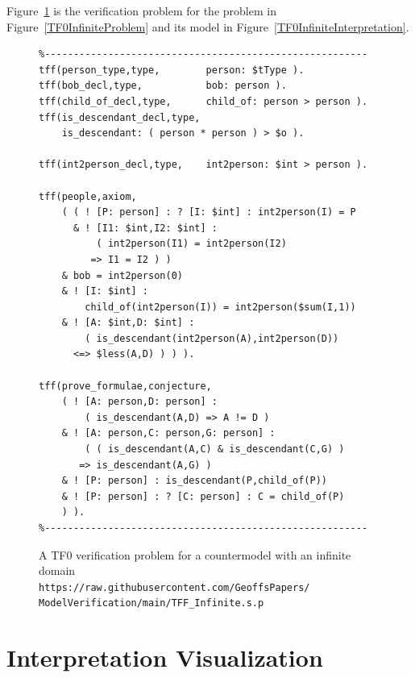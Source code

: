 \documentclass[letterpaper]{article}
\begin{document}
Figure~\ref{TF0InfiniteVerification} is the verification problem for the problem in 
Figure~\ref{TF0InfiniteProblem} and its model in Figure~\ref{TF0InfiniteInterpretation}.

\begin{figure}[htbp]
\scriptsize
{}
\begin{verbatim}
%--------------------------------------------------------
tff(person_type,type,        person: $tType ).
tff(bob_decl,type,           bob: person ).
tff(child_of_decl,type,      child_of: person > person ).
tff(is_descendant_decl,type, 
    is_descendant: ( person * person ) > $o ).

tff(int2person_decl,type,    int2person: $int > person ).

tff(people,axiom,
    ( ( ! [P: person] : ? [I: $int] : int2person(I) = P
      & ! [I1: $int,I2: $int] : 
          ( int2person(I1) = int2person(I2) 
         => I1 = I2 ) )
    & bob = int2person(0)
    & ! [I: $int] : 
        child_of(int2person(I)) = int2person($sum(I,1))
    & ! [A: $int,D: $int] : 
        ( is_descendant(int2person(A),int2person(D)) 
      <=> $less(A,D) ) ) ).

tff(prove_formulae,conjecture,
    ( ! [A: person,D: person] : 
        ( is_descendant(A,D) => A != D )
    & ! [A: person,C: person,G: person] :
        ( ( is_descendant(A,C) & is_descendant(C,G) )
       => is_descendant(A,G) )
    & ! [P: person] : is_descendant(P,child_of(P))
    & ! [P: person] : ? [C: person] : C = child_of(P) 
    ) ).
%--------------------------------------------------------
\end{verbatim}
\caption{A TF0 verification problem for a countermodel with an infinite domain\\
{\scriptsize {\tt https://raw.githubusercontent.com/GeoffsPapers/\\
ModelVerification/main/TFF\_Infinite.s.p}}}
\label{TF0InfiniteVerification}
\end{figure}

\section{Interpretation Visualization}
\label{Visualization}
\end{document}
